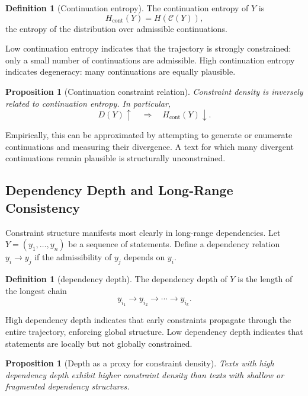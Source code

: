 \documentclass[12pt, oneside]{article}
\theoremstyle{plain}
\newtheorem{proposition}[theorem]{Proposition}
\theoremstyle{definition}
\newtheorem{definition}[theorem]{Definition}
\theoremstyle{remark}
\begin{document}
\begin{definition}[Continuation entropy]
The continuation entropy of $Y$ is
\[
  H_{\text{cont}}(Y) = H(\mathcal{C}(Y)),
\]
the entropy of the distribution over admissible continuations.
\end{definition}

Low continuation entropy indicates that the trajectory is strongly constrained:
only a small number of continuations are admissible. High continuation entropy
indicates degeneracy: many continuations are equally plausible.

\begin{proposition}[Continuation constraint relation]
Constraint density is inversely related to continuation entropy. In particular,
\[
  D(Y) \uparrow \quad \Rightarrow \quad H_{\text{cont}}(Y) \downarrow.
\]
\end{proposition}

Empirically, this can be approximated by attempting to generate or enumerate
continuations and measuring their divergence. A text for which many divergent
continuations remain plausible is structurally unconstrained.

\subsection{Dependency Depth and Long-Range Consistency}

Constraint structure manifests most clearly in long-range dependencies. Let
$Y = (y_1, \dots, y_n)$ be a sequence of statements. Define a dependency relation
$y_i \rightarrow y_j$ if the admissibility of $y_j$ depends on $y_i$.

\begin{definition}[dependency depth]
The dependency depth of $Y$ is the length of the longest chain
\[
  y_{i_1} \rightarrow y_{i_2} \rightarrow \cdots \rightarrow y_{i_k}.
\]
\end{definition}

High dependency depth indicates that early constraints propagate through the
entire trajectory, enforcing global structure. Low dependency depth indicates
that statements are locally but not globally constrained.

\begin{proposition}[Depth as a proxy for constraint density]
Texts with high dependency depth exhibit higher constraint density than texts
with shallow or fragmented dependency structures.
\end{proposition}
\end{document}
